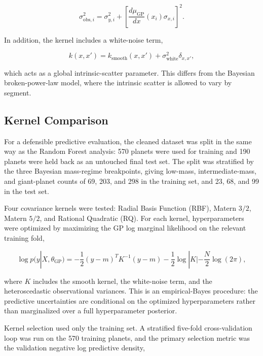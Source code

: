 \documentclass{article}
\numberwithin{equation}{section}
\begin{document}
\begin{equation}
\sigma_{\mathrm{obs},i}^2
=
\sigma_{y,i}^2
+
\left[
\frac{d\mu_{\mathrm{GP}}}{dx}(x_i)\sigma_{x,i}
\right]^2.
\end{equation}

In addition, the kernel includes a white-noise term,

\begin{equation}
k(x,x')
=
k_{\mathrm{smooth}}(x,x')
+
\sigma_{\mathrm{white}}^2 \delta_{x,x'},
\end{equation}

which acts as a global intrinsic-scatter parameter. This differs from the Bayesian broken-power-law model, where the intrinsic scatter is allowed to vary by segment.

\subsection{Kernel Comparison}

For a defensible predictive evaluation, the cleaned dataset was split in the same way as the Random Forest analysis: 570 planets were used for training and 190 planets were held back as an untouched final test set. The split was stratified by the three Bayesian mass-regime breakpoints, giving low-mass, intermediate-mass, and giant-planet counts of 69, 203, and 298 in the training set, and 23, 68, and 99 in the test set.

Four covariance kernels were tested: Radial Basis Function (RBF), Matern $3/2$, Matern $5/2$, and Rational Quadratic (RQ). For each kernel, hyperparameters were optimized by maximizing the GP log marginal likelihood on the relevant training fold,

\begin{equation}
\log p(y|X,\theta_{\mathrm{GP}})
=
-\frac{1}{2}(y-m)^T K^{-1}(y-m)
-\frac{1}{2}\log |K|
-\frac{N}{2}\log(2\pi),
\end{equation}

where $K$ includes the smooth kernel, the white-noise term, and the heteroscedastic observational variances. This is an empirical-Bayes procedure: the predictive uncertainties are conditional on the optimized hyperparameters rather than marginalized over a full hyperparameter posterior.

Kernel selection used only the training set. A stratified five-fold cross-validation loop was run on the 570 training planets, and the primary selection metric was the validation negative log predictive density,
\end{document}
